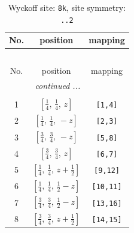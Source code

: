 \documentclass[fleqn,8pt]{jsarticle}
\begin{document}
\begin{longtable}{ccc}
\caption{Wyckoff site: {\tt 8k}, site symmetry: {\tt ..2}}
 \\
 \hline \hline
No. & position & mapping \\ \hline \endfirsthead

\multicolumn{2}{l}{\tablename\ \thetable{}} \\
 \hline \hline
No. & position & mapping \\ \hline \endhead

 \hline \hline
\multicolumn{2}{r}{\footnotesize\it continued ...} \\ \endfoot

 \hline \hline
\multicolumn{2}{r}{} \\ \endlastfoot

1 & $\left[ \frac{1}{4},\, \frac{1}{4},\, z \right]$ & {\tt [1,4]} \\ \hline
2 & $\left[ \frac{1}{4},\, \frac{1}{4},\, - z \right]$ & {\tt [2,3]} \\ \hline
3 & $\left[ \frac{3}{4},\, \frac{3}{4},\, - z \right]$ & {\tt [5,8]} \\ \hline
4 & $\left[ \frac{3}{4},\, \frac{3}{4},\, z \right]$ & {\tt [6,7]} \\ \hline
5 & $\left[ \frac{1}{4},\, \frac{1}{4},\, z + \frac{1}{2} \right]$ & {\tt [9,12]} \\ \hline
6 & $\left[ \frac{1}{4},\, \frac{1}{4},\, \frac{1}{2} - z \right]$ & {\tt [10,11]} \\ \hline
7 & $\left[ \frac{3}{4},\, \frac{3}{4},\, \frac{1}{2} - z \right]$ & {\tt [13,16]} \\ \hline
8 & $\left[ \frac{3}{4},\, \frac{3}{4},\, z + \frac{1}{2} \right]$ & {\tt [14,15]} \\
\end{longtable}
\renewcommand{\arraystretch}{1.2}
\end{document}

